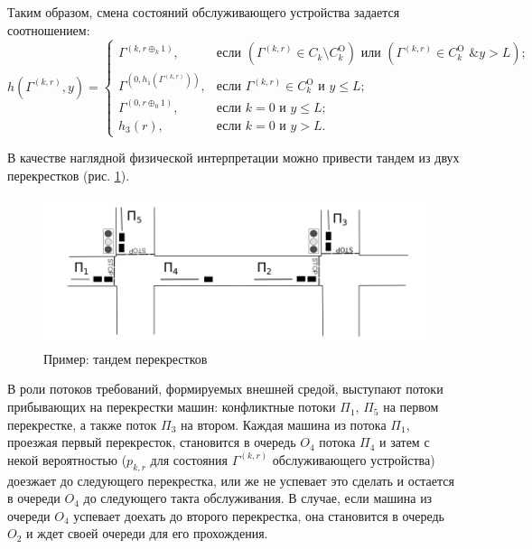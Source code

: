 \documentclass[a4paper,twoside]{article}
\theoremstyle{theorem}
\theoremstyle{remark}
\begin{document}
Таким образом, смена состояний обслуживающего устройства задается соотношением:
\begin{equation}
h(\Gamma^{(k,r)},y) = 
\begin{cases}
\Gamma^{(k,r \oplus_k 1)},&  \text{если } (\Gamma^{(k,r)}\in C_k\setminus C_k^{\mathrm{O}}) \text{ или } (\Gamma^{(k,r)}\in C_k^{\mathrm{O}} \text{ \& } y>L);\\
\Gamma^{(0,h_1(\Gamma^{(k,r)}))},&  \text{если } \Gamma^{(k,r)}\in C_k^{\mathrm{O}} \text{ и } y\leqslant L;\\
\Gamma^{(0,r \oplus_0 1)},&  \text{если } k=0 \text{ и } y\leqslant L;\\
h_3(r),&  \text{если } k=0 \text{ и } y > L.
\end{cases}
\label{hLaw}
\end{equation}

В качестве наглядной физической интерпретации можно привести тандем из двух перекрестков (рис. \ref{crossroads}).
\begin{figure}[t]
\includegraphics[scale=0.41]{Crossroads_grayscale.png}
\caption{Пример: тандем перекрестков}
\label{crossroads}
\end{figure}
В роли потоков требований, формируемых внешней средой, выступают потоки прибывающих на перекрестки машин: конфликтные потоки $\Pi_1$, $\Pi_5$ на первом перекрестке, а также поток $\Pi_3$ на втором. Каждая машина из потока $\Pi_1$, проезжая первый перекресток, становится в очередь $O_4$ потока $\Pi_4$ и затем с некой вероятностью ($p_{k,r}$ для состояния $\Gamma^{(k,r)}$ обслуживающего устройства) доезжает до следующего перекрестка, или же не успевает это сделать и остается в очереди $O_4$ до следующего такта обслуживания. В случае, если машина из очереди $O_4$ успевает доехать до второго перекрестка, она становится в очередь $O_2$ и ждет своей очереди для его прохождения.
\end{document}
